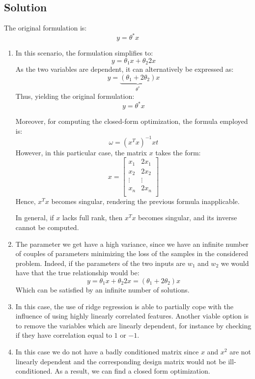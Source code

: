 \subsection{Solution}
The original formulation is: 
\[y=\theta^\ast x\]
\begin{enumerate}
    \item In this scenario, the formulation simplifies to:
        \[y=\theta_1x+\theta_2 2x\]
        As the two variables are dependent, it can alternatively be expressed as:
        \[y=\underbrace{\left(\theta_1+2\theta_2\right)}_{\theta^\ast} x\]
        Thus, yielding the original formulation:
        \[y=\theta^\ast x\]

        Moreover, for computing the closed-form optimization, the formula employed is:
        \[\omega={\left(x^T x\right)}^{-1}xt\]
        However, in this particular case, the matrix $x$ takes the form:
        \[x=\begin{bmatrix}
            x_1 & 2x_1 \\
            x_2 & 2x_2 \\
            \vdots & \vdots \\
            x_n & 2x_n \\
        \end{bmatrix}\]
        Hence, $x^T x$ becomes singular, rendering the previous formula inapplicable.

        In general, if $x$ lacks full rank, then $x^T x$ becomes singular, and its inverse cannot be computed.
    \item The parameter we get have a high variance, since we have an infinite number of couples of parameters minimizing the loss of the samples in the considered problem. 
        Indeed, if the parameters of the two inputs are $w_1$ and $w_2$ we would have that the true relationship would be:
        \[y=\theta_1x+\theta_2 2x=\left(\theta_1+2\theta_2\right)x\]
        Which can be satisfied by an infinite number of solutions.
    \item In this case, the use of ridge regression is able to partially cope with the influence of using highly linearly correlated features. 
        Another viable option is to remove the variables which are linearly dependent, for instance by checking if they have correlation equal to $1$ or $-1$. 
    \item In this case we do not have a badly conditioned matrix since $x$ and $x^2$ are not linearly dependent and the corresponding design matrix would not be ill-conditioned.
        As a result, we can find a closed form optimization. 
\end{enumerate}